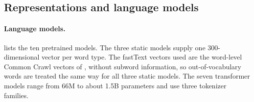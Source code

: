 \documentclass{ijis}
\begin{document}
\subsection{Representations and language models}\label{sec:representations}

\paragraph{Language models.}  lists the ten pretrained models. The three static models supply one 300-dimensional vector per word type. The fastText vectors used are the word-level Common Crawl vectors of \cite{mikolov2018advances}, without subword information, so out-of-vocabulary words are treated the same way for all three static models. The seven transformer models range from 66M to about 1.5B parameters and use three tokenizer families.
\end{document}
